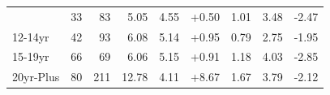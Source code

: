 \begin{table}
\begin{tabular}[t]{lrrrrrrrr}
{\hspace{1em}9-11yr & 33 & 83 & 5.05 & 4.55 & +0.50 & 1.01 & 3.48 & -2.47\\
\hspace{1em}12-14yr & 42 & 93 & 6.08 & 5.14 & +0.95 & 0.79 & 2.75 & -1.95\\
\hspace{1em}15-19yr & 66 & 69 & 6.06 & 5.15 & +0.91 & 1.18 & 4.03 & -2.85\\
\hspace{1em}20yr-Plus & 80 & 211 & 12.78 & 4.11 & +8.67 & 1.67 & 3.79 & -2.12\\
\bottomrule
\end{tabular}
\endgroup{}
\end{table}
